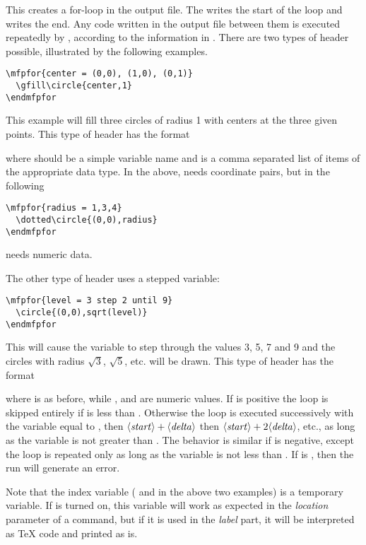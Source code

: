 \documentclass[letterpaper]{article}
\begin{document}
This creates a for-loop in the \MF{} output file. The  writes
the start of the loop and  writes the end. Any code
written in the output file between them is executed repeatedly by
\MF{}, according to the information in . There are
two types of header possible, illustrated by the following examples.
\begin{verbatim}
\mfpfor{center = (0,0), (1,0), (0,1)}
  \gfill\circle{center,1}
\endmfpfor
\end{verbatim}
This example will fill three circles of radius 1 with centers at the
three given points. This type of header has the format
\begin{display}
\end{display}
where  should be a simple variable name and  is a
comma separated list of items of the appropriate data type. In the
above,  needs coordinate pairs, but in the following
\begin{verbatim}
\mfpfor{radius = 1,3,4}
  \dotted\circle{(0,0),radius}
\endmfpfor
\end{verbatim}
 needs numeric data.

The other type of header uses a stepped variable:
\begin{verbatim}
\mfpfor{level = 3 step 2 until 9}
  \circle{(0,0),sqrt(level)}
\endmfpfor
\end{verbatim}
This will cause the \MF{} variable  to step through the
values 3, 5, 7 and 9 and the circles with radius $\sqrt{3}$, $\sqrt{5}$,
etc. will be drawn. This type of header has the format
\begin{display}
\end{display}
where  is as before, while ,  and
 are numeric values. If  is positive the loop is
skipped entirely if  is less than . Otherwise the
loop is executed successively with the variable equal to ,
then $\langle\mbox{\rmfamily\itshape start\/}\rangle + \langle\mbox{\rmfamily\itshape delta\/}\rangle$ then $\langle\mbox{\rmfamily\itshape start\/}\rangle + 2\langle\mbox{\rmfamily\itshape delta\/}\rangle$,
etc., as long as the variable is not greater than . The
behavior is similar if  is negative, except the loop is
repeated only as long as the variable is not less than . If
 is , then the \MF{} run will generate an error.

Note that the index variable ( and  in the above
two examples) is a temporary \MF{} variable. If  is turned
on, this variable will work as expected in the \emph{location} parameter
of a  command, but if it is used in the \emph{label} part, it
will be interpreted as \TeX{} code and printed as is.
\end{document}
